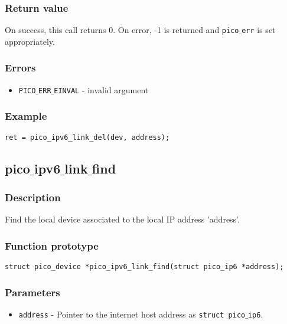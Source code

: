 \subsubsection*{Return value}
On success, this call returns 0.
On error, -1 is returned and \texttt{pico$\_$err} is set appropriately.

\subsubsection*{Errors}
\begin{itemize}[noitemsep]
\item \texttt{PICO$\_$ERR$\_$EINVAL} - invalid argument
\end{itemize}

\subsubsection*{Example}
\begin{verbatim}
ret = pico_ipv6_link_del(dev, address);
\end{verbatim}



\subsection{pico$\_$ipv6$\_$link$\_$find}

\subsubsection*{Description}
Find the local device associated to the local IP address 'address'.

\subsubsection*{Function prototype}
\begin{verbatim}
struct pico_device *pico_ipv6_link_find(struct pico_ip6 *address);
\end{verbatim}

\subsubsection*{Parameters}
\begin{itemize}[noitemsep]
\item \texttt{address} - Pointer to the internet host address as \texttt{struct pico$\_$ip6}.
\end{itemize}

